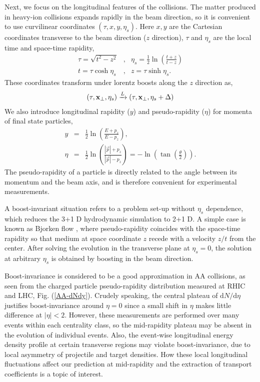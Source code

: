 \documentclass[aps,prl,twocolumn,groupedaddress]{revtex4-1}
\begin{document}
	Next, we focus on the longitudinal features of the collisions.
	The matter produced in heavy-ion collisions expands rapidly in the beam direction, so it is convenient to use curvilinear coordinates $(\tau, x, y, \eta_s)$. 
	Here $x, y$ are the Cartesian coordinates transverse to the beam direction ($z$ direction), $\tau$ and $\eta_s$ are the local time and space-time rapidity,
	\begin{eqnarray}
		\tau = \sqrt{t^2 - z^2} &,& \eta_s = \frac{1}{2}\ln\left(\frac{t+z}{t-z}\right) \\
		t = \tau \cosh \eta_s &,& z = \tau \sinh \eta_s.
	\end{eqnarray}
	These coordinates transform under lorentz boosts along the $z$ direction as,
	\begin{eqnarray}
		(\tau, {\bf x_{\perp}}, \eta_s) \xrightarrow{L} (\tau, {\bf x_{\perp}}, \eta_s + \Delta)
	\end{eqnarray}
	We also introduce longitudinal rapidity ($y$) and pseudo-rapidity ($\eta$) for momenta of final state particles,
	\begin{eqnarray}
	y &=& \frac{1}{2}\ln\left( \frac{E + p_z}{E - p_z} \right), \\
	\eta &=& \frac{1}{2}\ln\left( \frac{|\vec{p}|+p_z}{|\vec{p}|-p_z} \right) = -\ln\left(\tan\left(\frac{\theta}{2}\right)\right).
	\end{eqnarray}
	The pseudo-rapidity of a particle is directly related to the angle between its momentum and the beam axis, and is therefore convenient for experimental measurements.
	
	A boost-invariant situation refers to a problem set-up without $\eta_s$ dependence, which reduces the 3+1 D hydrodynamic simulation to 2+1 D. 
	A simple case is known as Bjorken flow \citep{Bjorken:1982qr}, where pseudo-rapidity coincides with the space-time rapidity so that medium at space coordinate $z$ recede with a velocity $z/t$ from the center.
	After solving the evolution in the transverse plane at $\eta_s = 0$, the solution at arbitrary $\eta_s$ is obtained by boosting in the beam direction.
	
	Boost-invariance is considered to be a good approximation in AA collisions, as seen from the charged particle pseudo-rapidity distribution measured at RHIC and LHC, Fig. (\ref{AA-dNdy}). 
	Crudely speaking, the central plateau of $\mathrm{d}N/\mathrm{d}\eta$ justifies boost-invariance around $\eta = 0$ since a small shift in $\eta$ makes little difference at $|\eta| < 2$. 
	However, these measurements are performed over many events within each centrality class, so the mid-rapidity plateau may be absent in the evolution of individual events.
	Also, the event-wise longitudinal energy density profile at certain transverse regions may violate boost-invariance, due to local asymmetry of projectile and target densities. 
	How these local longitudinal fluctuations affect our prediction at mid-rapidity and the extraction of transport coefficients is a topic of interest.
	
\end{document}
